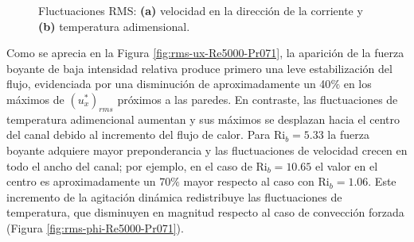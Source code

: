 \begin{figure}[H]
  \centering
  
    \caption{Fluctuaciones RMS: \textbf{(a)} velocidad en la dirección de la corriente y \textbf{(b)} temperatura adimensional.}
    \label{fig:rms-Re5000-Pr071}
\end{figure}

Como se aprecia en la Figura \ref{fig:rms-ux-Re5000-Pr071}, la aparición de la fuerza boyante de baja intensidad relativa produce primero una leve estabilización del flujo, evidenciada por una disminución de aproximadamente un 40$\%$ en los máximos de $(u^*_x)_{rms}$ próximos a las paredes. En contraste, las fluctuaciones de temperatura adimencional aumentan y sus máximos se desplazan hacia el centro del canal debido al incremento del flujo de calor. Para $\text{Ri}_b=5\text{.}33$ la fuerza boyante adquiere mayor preponderancia y las fluctuaciones de velocidad crecen en todo el ancho del canal; por ejemplo, en el caso de $\text{Ri}_b=10\text{.}65$ el valor en el centro es aproximadamente un 70$\%$ mayor respecto al caso con $\text{Ri}_b=1\text{.}06$. Este incremento de la agitación dinámica redistribuye las fluctuaciones de temperatura, que disminuyen en magnitud respecto al caso de convección forzada (Figura \ref{fig:rms-phi-Re5000-Pr071}).

